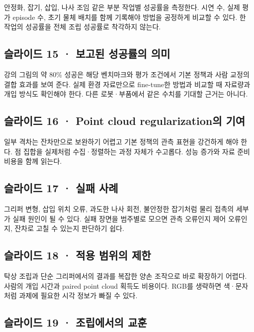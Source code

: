 \documentclass[11pt,a4paper]{article}
\begin{document}
안정화, 잡기, 삽입, 나사 조임 같은 부분 작업별 성공률을 측정한다. 시연 수, 실제 평가 episode 수, 초기 물체 배치를 함께 기록해야 방법을 공정하게 비교할 수 있다. 한 작업의 성공률을 전체 조립 성공률로 착각하지 않는다.\par

\subsection{슬라이드 15 · 보고된 성공률의 의미}

강의 그림의 약 80\% 성공은 해당 벤치마크와 평가 조건에서 기본 정책과 사람 교정의 결합 효과를 보여 준다. 실제 환경 자료만으로 fine-tune한 방법과 비교할 때 자료량과 개입 방식도 확인해야 한다. 다른 로봇·부품에서 같은 수치를 기대할 근거는 아니다.\par

\subsection{슬라이드 16 · Point cloud regularization의 기여}

일부 격차는 잔차만으로 보완하기 어렵고 기본 정책의 관측 표현을 강건하게 해야 한다. 점 집합을 실제처럼 수집·정렬하는 과정 자체가 수고롭다. 성능 증가와 자료 준비 비용을 함께 읽는다.\par

\subsection{슬라이드 17 · 실패 사례}

그리퍼 변형, 삽입 위치 오류, 과도한 나사 회전, 불안정한 잡기처럼 물리 접촉의 세부가 실패 원인이 될 수 있다. 실패 장면을 범주별로 모으면 관측 오류인지 제어 오류인지, 잔차로 고칠 수 있는지 판단하기 쉽다.\par

\subsection{슬라이드 18 · 적용 범위의 제한}

탁상 조립과 단순 그리퍼에서의 결과를 복잡한 양손 조작으로 바로 확장하기 어렵다. 사람의 개입 시간과 paired point cloud 획득도 비용이다. RGB를 생략하면 색·문자처럼 과제에 필요한 시각 정보가 빠질 수 있다.\par

\subsection{슬라이드 19 · 조립에서의 교훈}
\end{document}
